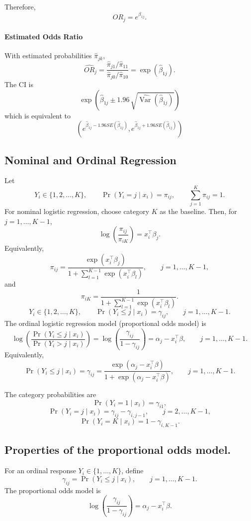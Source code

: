 \documentclass[11pt]{article}
\theoremstyle{definition}
\begin{document}
Therefore,
\[
OR_j = e^{\beta_{1j}}.
\]

\paragraph{Estimated Odds Ratio}
With estimated probabilities $\hat\pi_{jk}$,
\[
\widehat{OR}_j
=
\frac{\hat\pi_{j1}/\hat\pi_{11}}
     {\hat\pi_{j0}/\hat\pi_{10}}
=
\exp(\hat\beta_{1j}).
\]
The CI is 
\[
\exp\!\left(
\hat{\beta}_{1j} \pm 1.96\,\sqrt{\widehat{\operatorname{Var}}(\hat{\beta}_{1j})}
\right)
\]
which is equivalent to
$$
\left(e^{\hat{\beta}_{1 j}-1.96 S E\left(\hat{\beta}_{1 j}\right)}, e^{\hat{\beta}_{1 j}+1.96 S E\left(\hat{\beta}_{1 j}\right)}\right)
$$
\subsection{Nominal and Ordinal Regression}
Let
\[
Y_i \in \{1,2,\dots,K\}, \qquad
\Pr(Y_i=j \mid x_i)=\pi_{ij}, \qquad
\sum_{j=1}^K \pi_{ij}=1.
\]
For nominal logistic regression, choose category \(K\) as the baseline. Then, for
\(j=1,\dots,K-1\),
\[
\log\left(\frac{\pi_{ij}}{\pi_{iK}}\right)=x_i^\top \beta_j.
\]
Equivalently,
\[
\pi_{ij}
=
\frac{\exp(x_i^\top \beta_j)}
{1+\sum_{l=1}^{K-1}\exp(x_i^\top \beta_l)},
\qquad j=1,\dots,K-1,
\]
and
\[
\pi_{iK}
=
\frac{1}
{1+\sum_{l=1}^{K-1}\exp(x_i^\top \beta_l)}.
\]
\[
Y_i \in \{1,2,\dots,K\}, \qquad
\Pr(Y_i \le j \mid x_i)=\gamma_{ij}, \qquad j=1,\dots,K-1.
\]
The ordinal logistic regression model (proportional odds model) is
\[
\log\left(\frac{\Pr(Y_i \le j \mid x_i)}{\Pr(Y_i > j \mid x_i)}\right)
=
\log\left(\frac{\gamma_{ij}}{1-\gamma_{ij}}\right)
=
\alpha_j - x_i^\top \beta,
\qquad j=1,\dots,K-1.
\]
Equivalently,
\[
\Pr(Y_i \le j \mid x_i)
=
\gamma_{ij}
=
\frac{\exp(\alpha_j - x_i^\top \beta)}
{1+\exp(\alpha_j - x_i^\top \beta)},
\qquad j=1,\dots,K-1.
\]

The category probabilities are
\[
\Pr(Y_i=1\mid x_i)=\gamma_{i1},
\]
\[
\Pr(Y_i=j\mid x_i)=\gamma_{ij}-\gamma_{i,j-1},
\qquad j=2,\dots,K-1,
\]
\[
\Pr(Y_i=K\mid x_i)=1-\gamma_{i,K-1}.
\]
\subsection*{Properties of the proportional odds model.}
For an ordinal response \(Y_i \in \{1,\dots,K\}\), define
\[
\gamma_{ij}=\Pr(Y_i \le j \mid x_i), \qquad j=1,\dots,K-1.
\]
The proportional odds model is
\[
\log\left(\frac{\gamma_{ij}}{1-\gamma_{ij}}\right)=\alpha_j-x_i^\top\beta.
\]
\end{document}
